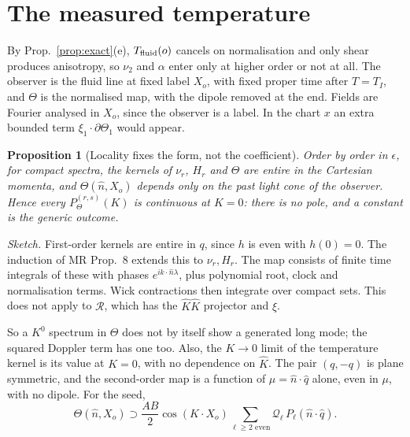 \documentclass[10pt]{article}
\newtheorem{proposition}{Proposition}
\newcommand{\eps}{\epsilon}
\newcommand{\nh}{\hat n}
\newcommand{\R}{\mathcal R}
\newcommand{\Kh}{\hat K}
\newcommand{\qh}{\hat q}
\begin{document}
\section{The measured temperature}

By Prop.~\ref{prop:exact}(e), $T_{\rm fluid}(o)$ cancels on normalisation and only shear produces anisotropy, so $\nu_2$ and $\alpha$ enter only at higher order or not at all. The observer is the fluid line at fixed label $X_o$, with fixed proper time after $T=T_I$, and $\Theta$ is the normalised map, with the dipole removed at the end. Fields are Fourier analysed in $X_o$, since the observer is a label. In the chart $x$ an extra bounded term $\xi_1\cdot\partial\Theta_1$ would appear.

\begin{proposition}[Locality fixes the form, not the coefficient]\label{prop:local}
Order by order in $\eps$, for compact spectra, the kernels of $\nu_r$, $H_r$ and $\Theta$ are entire in the Cartesian momenta, and $\Theta(\nh,X_o)$ depends only on the past light cone of the observer. Hence every $P_\Theta^{(r,s)}(K)$ is continuous at $K=0$: there is no pole, and a constant is the generic outcome.
\end{proposition}
\noindent\emph{Sketch.} First-order kernels are entire in $q$, since $h$ is even with $h(0)=0$. The induction of MR Prop.~8 extends this to $\nu_r,H_r$. The map consists of finite time integrals of these with phases $e^{ik\cdot\nh\lambda}$, plus polynomial root, clock and normalisation terms. Wick contractions then integrate over compact sets. This does not apply to $\R$, which has the $\Kh\Kh$ projector and $\xi$.

So a $K^0$ spectrum in $\Theta$ does not by itself show a generated long mode; the squared Doppler term has one too. Also, the $K\to0$ limit of the temperature kernel is its value at $K=0$, with no dependence on $\Kh$. The pair $(q,-q)$ is plane symmetric, and the second-order map is a function of $\mu=\nh\cdot\qh$ alone, even in $\mu$, with no dipole. For the seed,
\begin{equation}
\Theta(\nh,X_o)\supset\frac{AB}2\cos(K\!\cdot\!X_o)\sum_{\ell\ge2\text{ even}}\mathcal Q_\ell\,P_\ell(\nh\!\cdot\!\qh).
\end{equation}
\end{document}
